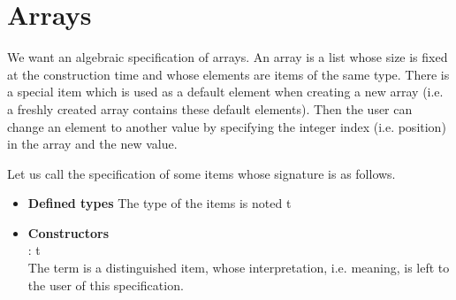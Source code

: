 \documentclass[11pt,a4paper]{article}
\author{Christian Rinderknecht}
\date{3 June 2005}
\newcommand\type[1]{\textsf{#1}}
\begin{document}
\maketitle

\section{Arrays}

We want an algebraic specification of arrays. An array is a list whose
size is fixed at the construction time and whose elements are items of
the same type. There is a special item which is used as a default
element when creating a new array (i.e. a freshly created array
contains these default elements). Then the user can change an element
to another value by specifying the integer index (i.e. position) in
the array and the new value.

\noindent Let us call  the specification of some items whose
signature is as follows.
\begin{itemize}

   \item \textbf{Defined types}
   The type of the items is noted \type{t}

   \item \textbf{Constructors}\\
    : \type{t}\\
   The term  is a distinguished item, whose
   interpretation, i.e. meaning, is left to the user of this
   specification.

\end{itemize}
\end{document}
